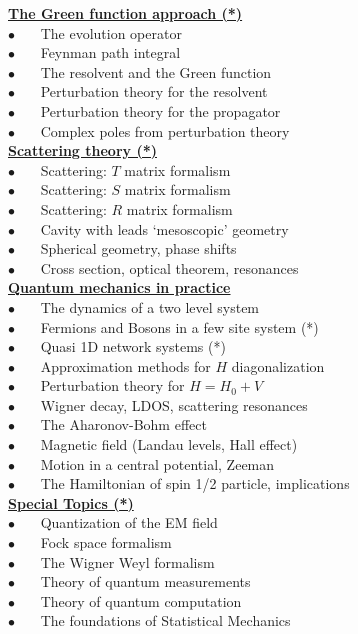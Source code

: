 \documentclass[onecolumn,fleqn, 11pt]{revtex4}
\newcommand{\bitem}{$\bullet$ \ \ \ }
\newcommand{\mpgt}[2][1.0\hsize]{\begin{minipage}[t]{#1}{#2}\end{minipage}}
\begin{document}
\mpgt[0.48\hsize]{

\footnotesize

\hyperlink{shdA5.1}{\bf The Green function approach (*)} \\

\bitem The evolution operator  \\ 
\bitem Feynman path integral  \\
\bitem The resolvent and the Green function  \\ 
\bitem Perturbation theory for the resolvent  \\
\bitem Perturbation theory for the propagator  \\
\bitem Complex poles from perturbation theory  \\ 



\hyperlink{shdA6.1}{\bf Scattering theory (*)} \\

\bitem Scattering: $T$ matrix formalism  \\
\bitem Scattering: $S$ matrix formalism  \\
\bitem Scattering: $R$ matrix formalism  \\
\bitem Cavity with leads `mesoscopic' geometry \\ 
\bitem Spherical geometry, phase shifts  \\ 
\bitem Cross section, optical theorem, resonances \\



\hyperlink{shdA7.1}{\bf Quantum mechanics in practice} \\

\bitem The dynamics of a two level system \\
\bitem Fermions and Bosons in a few site system (*) \\
\bitem Quasi 1D network systems (*) \\
\bitem Approximation methods for $H$ diagonalization \\ 
\bitem Perturbation theory for $H=H_0+V$ \\
\bitem Wigner decay, LDOS, scattering resonances \\
\bitem The Aharonov-Bohm effect \\
\bitem Magnetic field (Landau levels, Hall effect) \\
\bitem Motion in a central potential, Zeeman \\
\bitem The Hamiltonian of spin 1/2 particle, implications \\



\hyperlink{shdA10.1}{\bf Special Topics (*) } \\

\bitem Quantization of the EM field \\   
\bitem Fock space formalism \\
\bitem The Wigner Weyl formalism \\
\bitem Theory of quantum measurements \\ 
\bitem Theory of quantum computation \\
\bitem The foundations of Statistical Mechanics  

}
\end{document}
